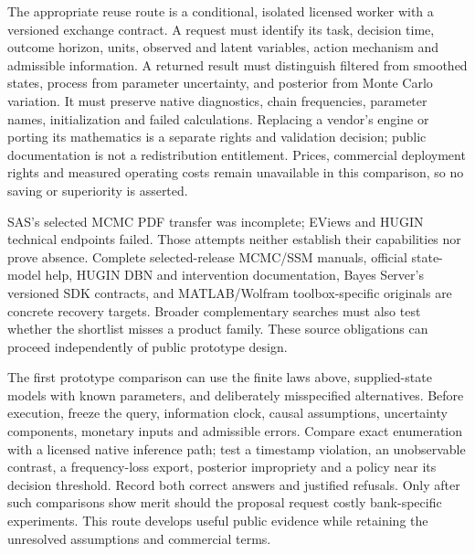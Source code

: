 The appropriate reuse route is a conditional, isolated licensed worker with a
versioned exchange contract. A request must identify its task, decision time,
outcome horizon, units, observed and latent variables, action mechanism and
admissible information. A returned result must distinguish filtered from
smoothed states, process from parameter uncertainty, and posterior from Monte
Carlo variation. It must preserve native diagnostics, chain frequencies,
parameter names, initialization and failed calculations. Replacing a vendor's
engine or porting its mathematics is a separate rights and validation decision;
public documentation is not a redistribution entitlement. Prices, commercial
deployment rights and measured operating costs remain unavailable in this
comparison, so no saving or superiority is asserted.

SAS's selected MCMC PDF transfer was incomplete; EViews and HUGIN technical
endpoints failed. Those attempts neither establish their capabilities nor
prove absence. Complete selected-release MCMC/SSM manuals, official state-model
help, HUGIN DBN and intervention documentation, Bayes Server's versioned SDK
contracts, and MATLAB/Wolfram toolbox-specific originals are concrete recovery
targets. Broader complementary searches must also test whether the shortlist
misses a product family. These source obligations can proceed independently of
public prototype design.

The first prototype comparison can use the finite laws above, supplied-state
models with known parameters, and deliberately misspecified alternatives.
Before execution, freeze the query, information clock, causal assumptions,
uncertainty components, monetary inputs and admissible errors. Compare exact
enumeration with a licensed native inference path; test a timestamp violation,
an unobservable contrast, a frequency-loss export, posterior impropriety and a
policy near its decision threshold. Record both correct answers and justified
refusals. Only after such comparisons show merit should the proposal request
costly bank-specific experiments. This route develops useful public evidence
while retaining the unresolved assumptions and commercial terms.
